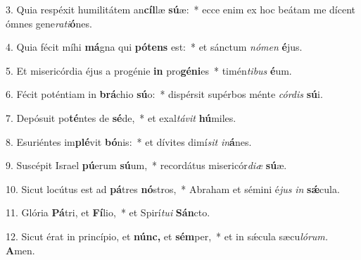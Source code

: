 \item 3. Quia respéxit humilitátem an\textbf{cíl}læ \textbf{sú}æ:~* ecce enim ex hoc beátam me dícent ómnes gene\textit{rati}\textbf{ó}nes.

\item 4. Quia fécit míhi \textbf{má}gna qui \textbf{pótens} est:~* et sánctum \textit{nómen} \textbf{é}jus.

\item 5. Et misericórdia éjus a progénie \textbf{in} pro\textbf{géni}es~* timén\textit{tibus} \textbf{é}um.

\item 6. Fécit poténtiam in \textbf{brá}chio \textbf{sú}o:~* dispérsit supérbos ménte \textit{córdis} \textbf{sú}i.

\item 7. Depósuit po\textbf{té}ntes de \textbf{sé}de,~* et exal\textit{távit} \textbf{hú}miles.

\item 8. Esuriéntes im\textbf{plé}vit \textbf{bó}nis:~* et dívites dimí\textit{sit} \textit{in}\textbf{á}nes.

\item 9. Suscépit Israel \textbf{pú}erum \textbf{sú}um,~* recordátus misericór\textit{diæ} \textbf{sú}æ.

\item 10. Sicut locútus est ad \textbf{pá}tres \textbf{nó}stros,~* Abraham et sémini é\textit{jus} \textit{in} \textbf{sǽ}cula.

\item 11. Glória \textbf{Pá}tri, et \textbf{Fí}lio,~* et Spirí\textit{tui} \textbf{Sán}cto.

\item 12. Sicut érat in princípio, et \textbf{núnc,} et \textbf{sém}per,~* et in sǽcula sæcu\textit{lórum.} \textbf{A}men.